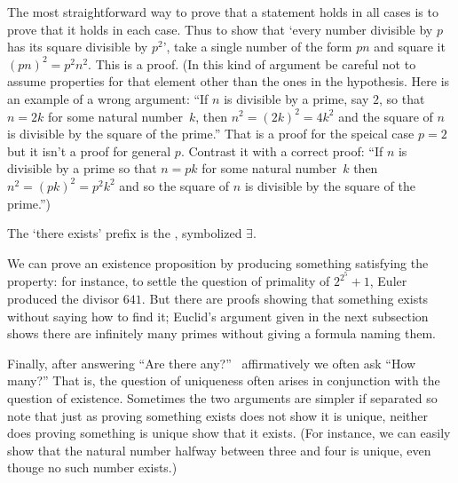 The most straightforward way to prove that 
a statement holds in all cases is to 
prove that it holds in each case.
Thus to show that `every number divisible by \( p \) has its
square divisible by \( p^2 \)', take a single number of the form
\( pn \) and square it \( (pn)^2=p^2n^2 \).
This is a  proof.
(In this kind of argument be careful not to assume 
properties for that element
other than the ones in the hypothesis.
Here is an example of a wrong argument:
``If \( n \) is divisible by a prime, say \( 2 \), so that \( n=2k \)
for some natural number~$k$,
then \( n^2=(2k)^2=4k^2 \) and the square of $n$ is divisible
by the square of the prime.''
That is a proof for the speical case \( p=2 \) but it isn't a proof for
general \( p \).
Contrast it with a correct proof:
``If \( n \) is divisible by a prime
so that \( n=pk \) for some natural number~$k$
then \( n^2=(pk)^2=p^2k^2 \) and so the square of $n$ is divisible
by the square of the prime.'')




The `there exists' prefix is the 
,
symbolized 
\( \exists \).


We can prove
an existence proposition by producing something satisfying
the property: for instance, to settle the question of primality of
\( 2^{2^5}+1 \), Euler produced the divisor \( 641 \)\cite{Sandifer}.
But there are proofs
showing that something exists without saying how to find it;
Euclid's argument given in the next subsection
shows there are infinitely many primes without giving a formula naming them.

Finally, after answering
``Are there any?''\ %
affirmatively we often ask ``How many?''
That is, the question of uniqueness often arises in conjunction
with the question of existence.
Sometimes the two arguments are simpler if separated so note that just as
proving something exists does not show it is unique,
neither does proving something is unique show that it exists.
(For instance, we can easily show that
the natural number halfway between three and four
is unique, even thouge no such number exists.)










